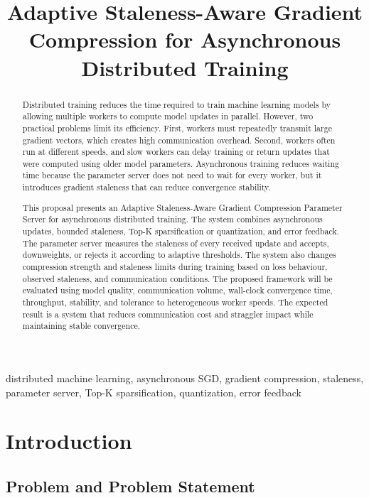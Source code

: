 \documentclass[conference]{IEEEtran}
\title{Adaptive Staleness-Aware Gradient Compression for Asynchronous Distributed Training}
\author{
\IEEEauthorblockN{Your Name(s)}
\IEEEauthorblockA{
Department of Information Technology\\
National Institute of Technology Karnataka, Surathkal\\
Email: your.email@nitk.edu.in
}
}
\begin{document}
\maketitle

\begin{abstract}
Distributed training reduces the time required to train machine learning models by allowing multiple workers to compute model updates in parallel. However, two practical problems limit its efficiency. First, workers must repeatedly transmit large gradient vectors, which creates high communication overhead. Second, workers often run at different speeds, and slow workers can delay training or return updates that were computed using older model parameters. Asynchronous training reduces waiting time because the parameter server does not need to wait for every worker, but it introduces gradient staleness that can reduce convergence stability.

This proposal presents an Adaptive Staleness-Aware Gradient Compression Parameter Server for asynchronous distributed training. The system combines asynchronous updates, bounded staleness, Top-K sparsification or quantization, and error feedback. The parameter server measures the staleness of every received update and accepts, downweights, or rejects it according to adaptive thresholds. The system also changes compression strength and staleness limits during training based on loss behaviour, observed staleness, and communication conditions. The proposed framework will be evaluated using model quality, communication volume, wall-clock convergence time, throughput, stability, and tolerance to heterogeneous worker speeds. The expected result is a system that reduces communication cost and straggler impact while maintaining stable convergence.
\end{abstract}

\begin{IEEEkeywords}
distributed machine learning, asynchronous SGD, gradient compression, staleness, parameter server, Top-K sparsification, quantization, error feedback
\end{IEEEkeywords}

\section{Introduction}

\subsection{Problem and Problem Statement}
\end{document}
